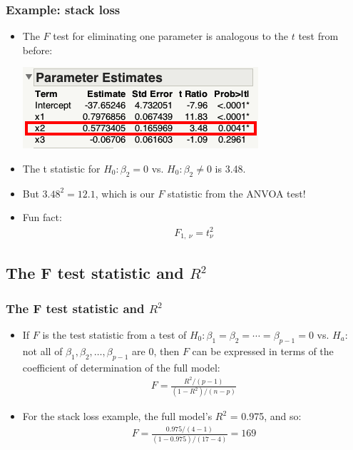 \documentclass[handout]{beamer}\usepackage[]{graphicx}\usepackage[]{color}
\numberwithin{equation}{section}
\begin{document}
\begin{frame}
\frametitle{Example: stack loss}
\begin{itemize}
\item The $F$ test for eliminating one parameter is analogous to the $t$ test from before:
\begin{center}
 \includegraphics{../../fig/funfacttftest.png}
\end{center} 
\pause \item The t statistic for $H_0: \beta_2 = 0$ vs. $H_0: \beta_2 \ne 0$ is 3.48.
\pause \item But $3.48^2 = 12.1$, which is our $F$ statistic from the ANVOA test!
\pause \item Fun fact:
\begin{align*}
F_{1, \ \nu} = t_{\nu}^2
\end{align*}
\end{itemize}
\end{frame}


\subsection{The F test statistic and $R^2$}

\begin{frame}
\frametitle{The F test statistic and $R^2$}
\begin{itemize}
\item If $F$ is the test statistic from a test of $H_0: \beta_1 = \beta_2 = \cdots = \beta_{p - 1} = 0$ vs. $H_a:$ not all of $\beta_1, \beta_2, \ldots, \beta_{p-1}$ are 0, then $F$ can be expressed in terms of the coefficient of determination of the full model:
\pause \begin{align*}
F = \frac{R^2/(p-1)}{(1-R^2)/(n - p)}
\end{align*}
\pause \item For the stack loss example, the full model's $R^2$ = 0.975, and so:
\begin{align*}
F = \frac{0.975 / (4-1)}{(1-0.975)/(17-4)} = 169
\end{align*}
\end{itemize}
\end{frame}
\end{document}
